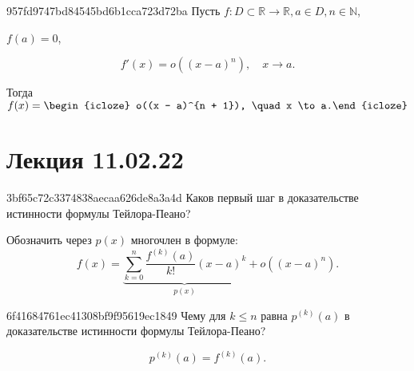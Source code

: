 \begin{note}{957fd9747bd84545bd6b1cca723d72ba}
    Пусть \( f : D \subset \mathbb R \to \mathbb R, a \in D, n \in \mathbb N \), \begin{icloze}{3}\( f(a) = 0 \),\end{icloze}
    \begin{icloze}{2}
        \[
            f'(x) = o((x - a)^{n} ), \quad x \to a.
        \]
    \end{icloze}

    Тогда \( f(x) = \begin{icloze}{1}o((x - a)^{n + 1}), \quad x \to a.\end{icloze} \)
\end{note}


\section{Лекция 11.02.22}
\begin{note}{3bf65c72c3374838aecaa626de8a3a4d}
    Каков первый шаг в доказательстве истинности формулы Тейлора-Пеано?

    \begin{cloze}{1}
        Обозначить через \( p(x) \) многочлен в формуле:
        \[
            f(x) = \underbrace{\sum_{k=0}^{n} \frac{f^{(k)} (a)}{k!} (x - a)^{k}}_{p(x)}  + o((x - a)^{n} ).
        \]
    \end{cloze}
\end{note}

\begin{note}{6f41684761ec41308bf9f95619ec1849}
    Чему для \( k \leqslant n \) равна \( p^{(k)} (a) \) в доказательстве истинности формулы Тейлора-Пеано?

    \begin{cloze}{1}
        \[
            p^{(k)} (a) = f^{(k)} (a).
        \]
    \end{cloze}
\end{note}

